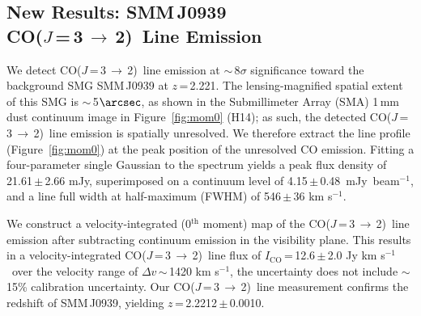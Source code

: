 \documentclass[twocolumn,apj,numberedappendix]{emulateapj}
\newcommand{\CO}{\mbox{CO($J$\,=\,3\,$\rightarrow$\,2) }}
\newcommand{\pmOne}{\mbox{$^{-1}$}}
\begin{document}
\subsection{New Results: SMM\,J0939\\ \CO Line Emission}
We detect \CO line emission at $\sim$\,8$\sigma$ significance toward the background SMG SMM\,J0939 at $z$\,=\,2.221.
The lensing-magnified spatial extent of this SMG is $\sim$\,5$\arcsec$, as shown in the Submillimeter Array (SMA) 1\,mm dust continuum image in Figure~\ref{fig:mom0} (H14); as such,
the detected \CO line emission is spatially unresolved. We therefore extract the line profile (Figure~\ref{fig:mom0}) at the peak position of the unresolved
CO emission. Fitting a four-parameter single Gaussian to the spectrum yields a peak flux density of 21.61\,$\pm$\,2.66\,\,mJy, superimposed on a
continuum level of 4.15\,$\pm$\,0.48~mJy~beam\pmOne, and a line full width at half-maximum (FWHM) of 546\,$\pm$\,36\,\,km\,\,s\pmOne.  \par
We construct a velocity-integrated (0$^\textrm{th}$ moment) map of the \CO line
emission after subtracting continuum emission in the visibility plane. This results in a velocity-integrated \CO line flux of $I_\textrm{CO}$\,=\,12.6\,$\pm$\,2.0 Jy km\,\,s\pmOne\ over the velocity range of $\Delta v$\,$\sim$\,1420 km\,\,s\pmOne, the uncertainty does not include $\sim$\,15\% calibration
uncertainty. Our \CO line measurement confirms the redshift of SMM\,J0939, yielding $z$\,=\,2.2212\,$\pm$\,0.0010.
\end{document}
